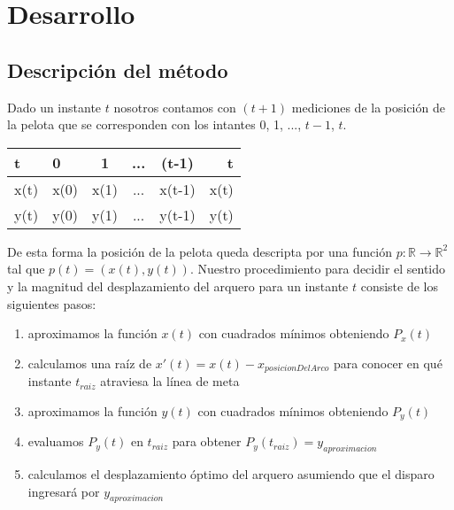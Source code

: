\section{Desarrollo}

\subsection{Descripción del método}
Dado un instante $t$ nosotros contamos con $(t+1)$ mediciones de la posición de la pelota que se corresponden con los intantes 
0, 1, ..., $t-1$, $t$. 
\begin{center}
  \begin{tabular}{l | l*{3}{c}r}
  t              & 0 & 1 & ... & (t-1) & t\\
  \hline
  x(t)	       & x(0) & x(1) & ... & x(t-1) & x(t)\\
  \hline
  y(t)	       & y(0) & y(1) & ... & y(t-1) & y(t)\\
  \end{tabular} 
\end{center}
De esta forma la posición de la pelota queda descripta por una función $p:\mathbb{R} \to \mathbb{R}^2$ tal que $p(t) = (x(t),y(t))$.
Nuestro procedimiento para decidir el sentido y la magnitud del desplazamiento del arquero para un instante $t$ consiste de los siguientes
pasos:
\begin{enumerate}
 \item aproximamos la función $x(t)$ con cuadrados mínimos obteniendo $P_x(t)$
 \item calculamos una raíz de $x'(t) = x(t) - x_{posicionDelArco}$ para conocer en qué instante $t_{raiz}$ atraviesa la línea de meta
 \item aproximamos la función $y(t)$ con cuadrados mínimos obteniendo $P_y(t)$
 \item evaluamos $P_y(t)$ en $t_{raiz}$ para obtener $P_y(t_{raiz}) = y_{aproximacion}$
 \item calculamos el desplazamiento óptimo del arquero asumiendo que el disparo ingresará por $y_{aproximacion}$
\end{enumerate}

